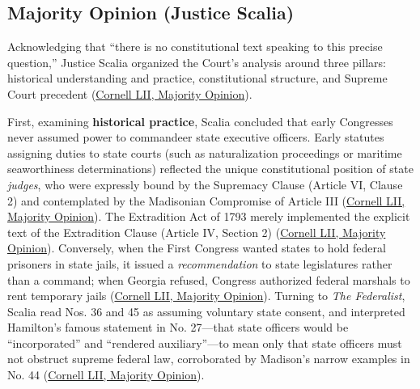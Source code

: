 \documentclass[12pt]{article}
\begin{document}
\subsection{Majority Opinion (Justice Scalia)}
Acknowledging that ``there is no constitutional text speaking to this precise question,'' Justice Scalia organized the Court's analysis around three pillars: historical understanding and practice, constitutional structure, and Supreme Court precedent (\href{https://www.law.cornell.edu/supct/html/95-1478.ZO.html}{Cornell LII, Majority Opinion}).

First, examining \textbf{historical practice}, Scalia concluded that early Congresses never assumed power to commandeer state executive officers. Early statutes assigning duties to state courts (such as naturalization proceedings or maritime seaworthiness determinations) reflected the unique constitutional position of state \textit{judges}, who were expressly bound by the Supremacy Clause (Article VI, Clause 2) and contemplated by the Madisonian Compromise of Article III (\href{https://www.law.cornell.edu/supct/html/95-1478.ZO.html}{Cornell LII, Majority Opinion}). The Extradition Act of 1793 merely implemented the explicit text of the Extradition Clause (Article IV, Section 2) (\href{https://www.law.cornell.edu/supct/html/95-1478.ZO.html}{Cornell LII, Majority Opinion}). Conversely, when the First Congress wanted states to hold federal prisoners in state jails, it issued a \textit{recommendation} to state legislatures rather than a command; when Georgia refused, Congress authorized federal marshals to rent temporary jails (\href{https://www.law.cornell.edu/supct/html/95-1478.ZO.html}{Cornell LII, Majority Opinion}). Turning to \textit{The Federalist}, Scalia read Nos. 36 and 45 as assuming voluntary state consent, and interpreted Hamilton's famous statement in No. 27---that state officers would be ``incorporated'' and ``rendered auxiliary''---to mean only that state officers must not obstruct supreme federal law, corroborated by Madison's narrow examples in No. 44 (\href{https://www.law.cornell.edu/supct/html/95-1478.ZO.html}{Cornell LII, Majority Opinion}).
\end{document}

